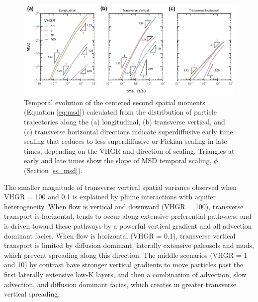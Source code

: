 \begin{figure}[ht]
	\includegraphics[width=\textwidth]{ch4_figs/msd_time_2amean_ta1_ai.pdf}
	\caption{Temporal evolution of the centered second spatial moments (Equation \ref{eq:msd}) calculated from the distribution of particle trajectories along the (a) longitudinal, (b) transverse vertical, and (c) transverse horizontal directions indicate superdiffusive early time scaling that reduces to less superdiffusive or Fickian scaling in late times, depending on the VHGR and direction of scaling. Triangles at early and late times show the slope of MSD temporal scaling, $\phi$ (Section \ref{ss_msd}).}
	\label{fig:msd}
\end{figure}

The smaller magnitude of transverse vertical spatial variance observed when VHGR = 100 and 0.1 is explained by plume interactions with aquifer heterogeneity. When flow is vertical and downward (VHGR = 100), transverse transport is horizontal, tends to occur along extensive preferential pathways, and is driven toward these pathways by a powerful vertical gradient and all advection dominant facies. When flow is horizontal (VHGR = 0.1), transverse vertical transport is limited by diffusion dominant, laterally extensive paleosols and muds, which prevent spreading along this direction. The middle scenarios (VHGR = 1 and 10) by contrast have stronger vertical gradients to move particles past the first laterally extensive low-K layers, and then a combination of advection, slow advection, and diffusion dominant facies, which creates in greater transverse vertical spreading. 

